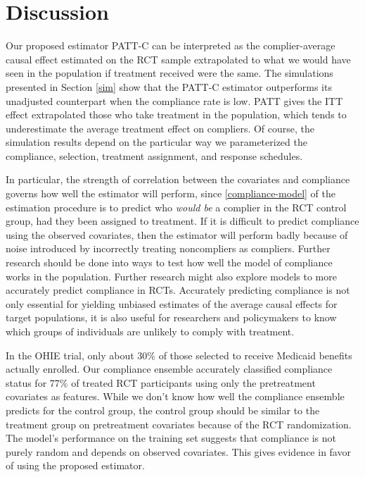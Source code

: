 \documentclass[hidelinks,12pt]{article}
\begin{document}
{\section{Discussion} \label{discussion}

{\color{red}Our proposed estimator PATT-C can be interpreted as the complier-average causal effect estimated on the RCT sample extrapolated to what we would have seen in the population if treatment received were the same.
The simulations presented in Section \ref{sim} show that the PATT-C estimator outperforms its unadjusted counterpart when the compliance rate is low. PATT gives the ITT effect extrapolated those who take treatment in the population, which tends to underestimate the average treatment effect on compliers.} Of course, the simulation results depend on the particular way we parameterized the compliance, selection, treatment assignment, and response schedules. 

In particular, the strength of correlation between the covariates and compliance governs how well the estimator will perform, since \ref{compliance-model} of the estimation procedure is to predict who \textit{would be} a complier in the RCT control group, had they been assigned to treatment. If it is difficult to predict compliance using the observed covariates, then the estimator will perform badly because of noise introduced by incorrectly treating noncompliers as compliers. Further research should be done into ways to test how well the model of compliance works in the population. Further research might also explore models to more accurately predict compliance in RCTs.  Accurately predicting compliance is not only essential for yielding unbiased estimates of the average causal effects for target populations, it is also useful for researchers and policymakers to know which groups of individuals are unlikely to comply with treatment. 

In the OHIE trial, only about $30\%$ of those selected to receive Medicaid benefits actually enrolled. Our compliance ensemble accurately classified compliance status for 77\% of treated RCT participants using only the pretreatment covariates as features. While we don't know how well the compliance ensemble predicts for the control group, the control group should be similar to the treatment group on pretreatment covariates because of the RCT randomization. The model's performance on the training set suggests that compliance is not purely random and depends on observed covariates. This gives evidence in favor of using the proposed estimator. 


}
\end{document}
